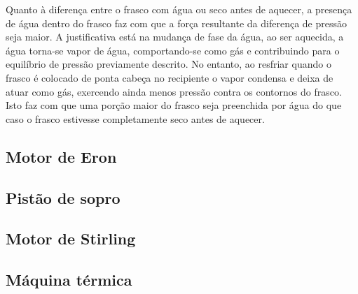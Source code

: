 Quanto à diferença entre o frasco com água ou seco antes de aquecer, a presença de água dentro do frasco faz com que a força resultante da diferença de pressão seja maior. A justificativa está na mudança de fase da água, ao ser aquecida, a água torna-se vapor de água, comportando-se como gás e contribuindo para o equilíbrio de pressão previamente descrito. No entanto, ao resfriar quando o frasco é colocado de ponta cabeça no recipiente o vapor condensa e deixa de atuar como gás, exercendo ainda menos pressão contra os contornos do frasco. Isto faz com que uma porção maior do frasco seja preenchida por água do que caso o frasco estivesse completamente seco antes de aquecer.

\subsection{Motor de Eron} %


\subsection{Pistão de sopro} %

\subsection{Motor de Stirling} %

\subsection{Máquina térmica} %



